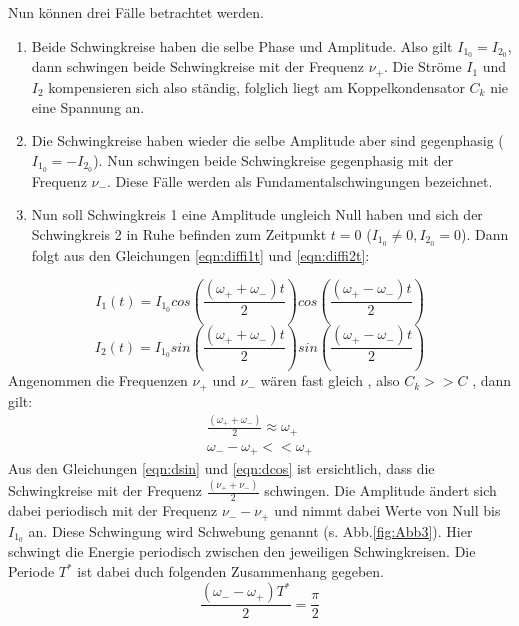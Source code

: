 Nun können drei Fälle betrachtet werden.
\begin{enumerate}
  \item Beide Schwingkreise haben die selbe Phase und Amplitude. Also gilt $I_{1_{0}}= I_{2_{0}}$, dann schwingen beide Schwingkreise mit der Frequenz $\nu_+$.
  Die Ströme $I_1$ und $I_2$ kompensieren sich also ständig, folglich liegt am Koppelkondensator $C_k$ nie eine Spannung an.

  \item Die Schwingkreise haben wieder die selbe Amplitude aber sind gegenphasig ($I_{1_{0}}= - I_{2_{0}}$). Nun schwingen beide Schwingkreise gegenphasig mit der Frequenz $\nu_-$.
   Diese Fälle werden als Fundamentalschwingungen bezeichnet.

  \item Nun soll Schwingkreis 1 eine Amplitude ungleich Null haben und sich der Schwingkreis 2 in Ruhe befinden zum Zeitpunkt $t= 0$ ($I_{1_{0}}\neq 0 , I_{2_{0}}= 0$).
  Dann folgt aus den Gleichungen \eqref{eqn:diffi1t} und \eqref{eqn:diffi2t}:
\end{enumerate}
  \begin{equation}
    I_1 (t) = I_{1_0} cos \left( \frac{(\omega_+ + \omega_-)t}{2}\right) cos \left( \frac{(\omega_+ - \omega_-)t}{2}\right)
  \label{eqn:dcos}
  \end{equation}
  \begin{equation}
    I_2 (t) = I_{1_0} sin \left( \frac{(\omega_+ + \omega_-)t}{2}\right) sin \left( \frac{(\omega_+ - \omega_-)t}{2}\right)
  \label{eqn:dsin}
  \end{equation}
  Angenommen die Frequenzen $ \nu_+$ und $ \nu_-$ wären fast gleich , also $ C_k >> C $ , dann gilt:
  \begin{align}
    \frac{\left(\omega_+ + \omega_- \right)}{2} \approx \omega_+ \\
     \omega_- - \omega_+  << \omega_+
  \end{align}
  Aus den Gleichungen \eqref{eqn:dsin} und \eqref{eqn:dcos} ist ersichtlich, dass die Schwingkreise mit der Frequenz $\frac{(\nu_+ + \nu_-)}{2}$ schwingen. Die Amplitude ändert sich
  dabei periodisch mit der Frequenz $ \nu_- - \nu_+$ und nimmt dabei Werte von Null bis $ I_{1_0}$ an. Diese Schwingung wird Schwebung genannt (s. Abb.\ref{fig:Abb3}). Hier schwingt die Energie periodisch zwischen
  den jeweiligen Schwingkreisen. Die Periode $T^*$ ist dabei duch folgenden Zusammenhang gegeben.
  \begin{equation}
      \frac{(\omega_- - \omega_+)T^*}{2} = \frac{\pi}{2}
  \end{equation}

